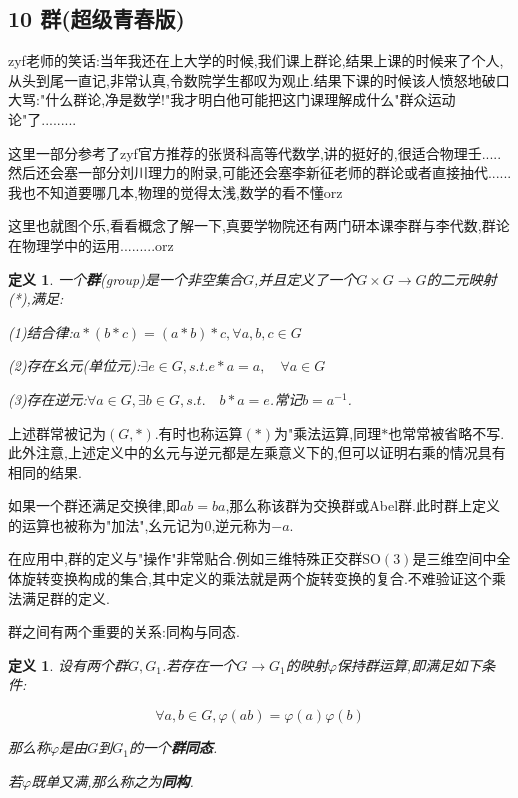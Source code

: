 \documentclass[UTF8]{article}
\begin{document}
	\newpage
	
	
	
	
	
\subsection*{10 群(超级青春版)}
	
	zyf老师的笑话:当年我还在上大学的时候,我们课上群论,结果上课的时候来了个人,从头到尾一直记,非常认真,令数院学生都叹为观止.结果下课的时候该人愤怒地破口大骂:"什么群论,净是数学!"我才明白他可能把这门课理解成什么"群众运动论"了.........

	这里一部分参考了zyf官方推荐的张贤科高等代数学\cite{ZhangXianKe},讲的挺好的,很适合物理壬.....然后还会塞一部分刘川理力\cite{LiuChuan}的附录,可能还会塞李新征老师的群论或者直接抽代......我也不知道要哪几本,物理的觉得太浅,数学的看不懂orz
	
	这里也就图个乐,看看概念了解一下,真要学物院还有两门研本课李群与李代数,群论在物理学中的运用.........orz
	
	\newtheorem*{Group}{定义}
	
	\begin{Group}
		
		一个\textbf{群}(group)是一个非空集合$G$,并且定义了一个$G \times G \to G$的二元映射(*),满足:
		
		(1)结合律:$a * (b * c) = (a * b) * c, \forall a,b,c \in G$
		
		(2)存在幺元(单位元):$\exists e \in G, s.t. e * a = a, \quad \forall a \in G$
		
		(3)存在逆元:$\forall a \in G, \exists b \in G, s.t. \quad b * a = e$.常记$b = a^{-1}$.
		
	\end{Group}
	
	上述群常被记为$(G , *)$.有时也称运算$(*)$为"乘法运算,同理$*$也常常被省略不写.此外注意,上述定义中的幺元与逆元都是左乘意义下的,但可以证明右乘的情况具有相同的结果.
	
	如果一个群还满足交换律,即$ab=ba$,那么称该群为交换群或Abel群.此时群上定义的运算也被称为"加法",幺元记为$0$,逆元称为$-a$.
	
	在应用中,群的定义与"操作"非常贴合.例如三维特殊正交群$\mathrm{SO(3)}$是三维空间中全体旋转变换构成的集合,其中定义的乘法就是两个旋转变换的复合.不难验证这个乘法满足群的定义.
	
	群之间有两个重要的关系:同构与同态.
	
	\newtheorem*{homomorphism}{定义}
	
	\begin{homomorphism}
		
		设有两个群$G,G_1$.若存在一个$G \to G_1$的映射$\varphi$保持群运算,即满足如下条件:
		
		\[\forall a,b \in G, \varphi(ab) = \varphi(a) \varphi(b) \]
		
		那么称$\varphi$是由$G$到$G_1$的一个\textbf{群同态}.
		
		若$\varphi$既单又满,那么称之为\textbf{同构}.
		
	\end{homomorphism}
	
\end{document}
